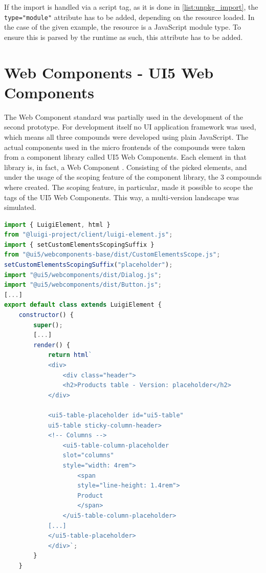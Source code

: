 If the import is handled via a script tag, as it is done in \ref{list:unpkg_import}, the \texttt{type="module"} attribute has to be added, depending on the resource loaded.
In the case of the given example, the resource is a JavaScript module type. To ensure this is parsed by the runtime as such, this attribute has to be added.\cite{js_module_type}

\section{Web Components - UI5 Web Components} 

The Web Component standard was partially used in the development of the second prototype. 
For development itself no UI application framework was used, which means all three compounds were developed using plain JavaScript. 
The actual components used in the micro frontends of the compounds were taken from a component library called UI5 Web Components. 
Each element in that library is, in fact, a Web Component \cite{ui5_wc_github}.
Consisting of the picked elements, and under the usage of the scoping feature of the component library, the 3 compounds where created. 
The scoping feature, in particular, made it possible to scope the tags of the UI5 Web Components. 
This way, a multi-version landscape was simulated.\cite{ui5_webcomponents_scoping}

\begin{lstlisting}[language=JavaScript,caption=Scoping feature used in the prototype, label=list:scoping_wc_prototype,  xleftmargin=.0\textwidth, xrightmargin=.0\textwidth]
import { LuigiElement, html } 
from "@luigi-project/client/luigi-element.js";
import { setCustomElementsScopingSuffix } 
from "@ui5/webcomponents-base/dist/CustomElementsScope.js";
setCustomElementsScopingSuffix("placeholder");
import "@ui5/webcomponents/dist/Dialog.js";
import "@ui5/webcomponents/dist/Button.js";
[...]
export default class extends LuigiElement {
	constructor() {
		super();
		[...]
		render() {
			return html`
			<div>
				<div class="header">
				<h2>Products table - Version: placeholder</h2>
			</div>
			
			<ui5-table-placeholder id="ui5-table" 
			ui5-table sticky-column-header>
			<!-- Columns -->
				<ui5-table-column-placeholder 
				slot="columns" 
				style="width: 4rem">
					<span 
					style="line-height: 1.4rem">
					Product
					</span>
				</ui5-table-column-placeholder>
			[...]
			</ui5-table-placeholder>
			</div>`;
		}
	}
\end{lstlisting}
	
